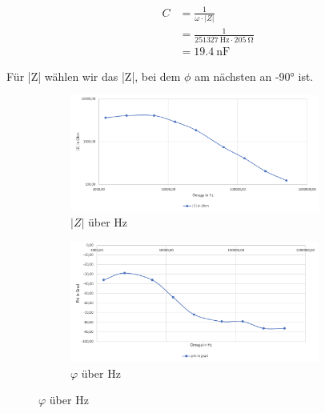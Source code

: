         \begin{equation}
            \begin{aligned}
                C &= \frac{1}{\omega \cdot |Z|}\\
                  &= \frac{1}{251327\ \mathrm{Hz} \cdot 205\ \mathrm{\Omega}}\\
                  &= 19.4\ \mathrm{nF}
                \label{eq:Versuch3_Kapazität}
            \end{aligned}
        \end{equation}

        Für |Z| wählen wir das |Z|, bei dem $\phi$ am nächsten an -90° ist.

        \begin{figure}[H]
            \begin{subfigure}{0.5\textwidth}
                \centering
                \includegraphics[width=0.9\textwidth]{bilder/Versuch3_1.png}
                \caption{$|Z|$ über $\mathrm{Hz}$}
                \label{fig:Versuch3_Messwerte_1}
            \end{subfigure}
            \begin{subfigure}{0.5\textwidth}
                \centering
                \includegraphics[width=0.9\textwidth]{bilder/Versuch3_2.png}
                \caption{$\varphi$ über $\mathrm{Hz}$}
                \label{fig:Versuch3_Messwerte_2}
            \end{subfigure}
        \end{figure}

